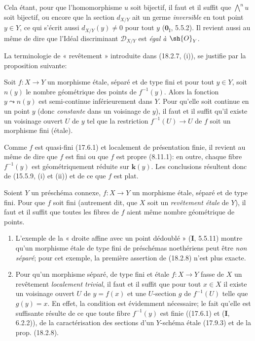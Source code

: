 
Cela étant, pour que l'homomorphisme $u$ soit bijectif, il faut et il suffit que $\bigwedge^n u$ soit bijectif, ou encore que la section $d_{X/Y}$ ait un germe \emph{inversible} en tout point $y\in Y$, ce qui s'écrit aussi $d_{X/Y}(y)\neq 0$ pour tout $y$ ($\mathbf{0}_{\mathrm I}$, 5.5.2). Il revient aussi au même de dire que l'Idéal discriminant $\mathscr{D}_{X/Y}$ est \emph{égal à $\sh{O}_Y$}.

La terminologie de « revêtement » introduite dans (18.2.7, (i)), se justifie par la proposition suivante:

\begin{proposition}[18.2.8]
\label{IV.18.2.8}
Soit $f:X\to Y$ un morphisme étale, séparé et de type fini et pour tout $y\in Y$, soit $n(y)$ le nombre géométrique des points de $f^{-1}(y)$. Alors la fonction $y\leadsto n(y)$ est semi-continue inférieurement dans $Y$. Pour qu'elle soit continue en un point $y$ \textup{(donc \emph{constante} dans un voisinage de $y$)}, il faut et il suffit qu'il existe un voisinage ouvert $U$ de $y$ tel que la restriction $f^{-1}(U)\to U$ de $f$ soit un morphisme fini (étale).
\end{proposition}

Comme $f$ est quasi-fini (17.6.1) et localement de présentation finie, il revient au même de dire que $f$ est fini ou que $f$ est propre (8.11.1): en outre, chaque fibre $f^{-1}(y)$ est géométriquement réduite sur $\boldsymbol{k}(y)$. Les conclusions résultent donc de (15.5.9, (i) et (ii)) et de ce que $f$ est plat.

\begin{corollary}[18.2.9]
\label{IV.18.2.9}
Soient $Y$ un préschéma connexe, $f:X\to Y$ un morphisme étale, séparé et de type fini. Pour que $f$ soit fini \textup{(autrement dit, que $X$ soit un \emph{revêtement étale} de $Y$)}, il faut et il suffit que toutes les fibres de $f$ aient même nombre géométrique de points.
\end{corollary}

\begin{remarks}[18.2.10]
\label{IV.18.2.10}
\begin{enumerate}
  \item[(i)] L'exemple de la « droite affine avec un point dédoublé » (\textbf{I}, 5.5.11) montre qu'un morphisme étale de type fini de préschémas noethériens peut être \emph{non séparé}; pour cet exemple, la première assertion de (18.2.8) n'est plus exacte.

  \item[(ii)] Pour qu'un morphisme séparé, de type fini et étale $f:X\to Y$ fasse de $X$ un revêtement \emph{localement trivial}, il faut et il suffit que pour tout $x\in X$ il existe un voisinage ouvert $U$ de $y=f(x)$ et une $U$-section $g$ de $f^{-1}(U)$ telle que $g(y)=x$. En effet, la condition est évidemment nécessaire; le fait qu'elle est suffisante résulte de ce que toute fibre $f^{-1}(y)$ est finie ((17.6.1) et (\textbf{I}, 6.2.2)), de la caractérisation des sections d'un $Y$-schéma étale (17.9.3) et de la prop. (18.2.8).
\end{enumerate}
\end{remarks}

